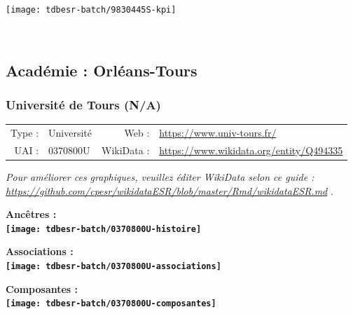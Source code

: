 \documentclass[12pt,french,]{article}
\begin{document}
\begin{center}\texttt{[image: tdbesr-batch/9830445S-kpi]} \end{center}\checkoddpage

\ifoddpage \fi ~\newpage  

\hypertarget{acaduxe9mie-orluxe9ans-tours}{%
\subsection{Académie :
Orléans-Tours}\label{acaduxe9mie-orluxe9ans-tours}}

\hypertarget{universituxe9-de-tours-na}{%
\subsubsection{Université de Tours
(N/A)}\label{universituxe9-de-tours-na}}

\begin{tabular*}{\textwidth}{rp{5cm}rl}  
\hline  
Type : & Université & Web : &\href{https://www.univ-tours.fr/}{https://www.univ-tours.fr/} \\  
UAI : & 0370800U & WikiData : & \href{https://www.wikidata.org/entity/Q494335}{https://www.wikidata.org/entity/Q494335} \\  
\hline  
\end{tabular*}

\textit{\scriptsize Pour améliorer ces graphiques, veuillez éditer WikiData selon ce guide :  \href{https://github.com/cpesr/wikidataESR/blob/master/Rmd/wikidataESR.md}{https://github.com/cpesr/wikidataESR/blob/master/Rmd/wikidataESR.md}}
.

\vspace{1cm}  
\begin{minipage}[b]{0.50\textwidth}\begin{center} \bf Ancêtres : \\  
\texttt{[image: tdbesr-batch/0370800U-histoire]} \end{center}\end{minipage}\begin{minipage}[b]{0.50\textwidth}\begin{center} \bf Associations : \\  
\texttt{[image: tdbesr-batch/0370800U-associations]} \end{center}\end{minipage}

\hrulefill

\begin{center} \bf Composantes : \\  
\texttt{[image: tdbesr-batch/0370800U-composantes]} \end{center}
\end{document}
